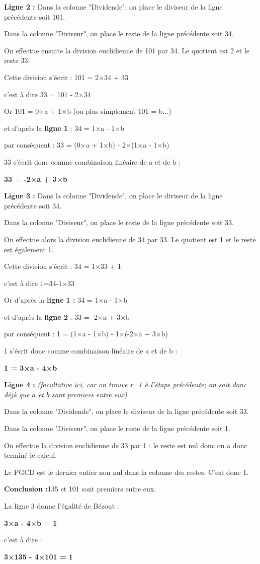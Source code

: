 \textbf{Ligne 2 :} Dans la colonne "Dividende", on place le diviseur de la ligne précédente soit 101.
\par
Dans la colonne "Diviseur", on place le reste de la ligne précédente soit 34.
\par
On effectue ensuite la division euclidienne de 101 par 34. Le quotient est 2 et le reste 33.
\par
Cette division s'écrit : 101 = 2×34 + 33
\par
c'est à dire 33 = 101 - 2×34
\par
Or 101 = 0×a + 1×b (ou plus simplement 101 = b...)
\par
et d'après la\textbf{ ligne 1} : 34 = 1×a - 1×b
\par
par conséquent : 33 = (0×a + 1×b) - 2×(1×a - 1×b)
\par
33 s'écrit donc  comme combinaison linéaire de a et de b :
\begin{center}\textbf{33 = -2×a + 3×b}\end{center}
\par
\textbf{Ligne 3 :} Dans la colonne "Dividende", on place le diviseur de la ligne précédente soit 34.
\par
Dans la colonne "Diviseur", on place le reste de la ligne précédente soit 33.
\par
On effectue alors la division euclidienne de 34 par 33. Le quotient est 1 et le reste est également 1.
\par
Cette division s'écrit : 34 = 1×33 + 1
\par
c'est à dire 1=34-1×33
\par
Or d'après la \textbf{ligne 1 :} 34 = 1×a - 1×b
\par
et d'après la \textbf{ligne 2} : 33 = -2×a + 3×b
\par
par conséquent : 1 = (1×a - 1×b) - 1×(-2×a + 3×b)
\par
1 s'écrit donc  comme combinaison linéaire de a et de b :
\begin{center}\textbf{1 = 3×a - 4×b}\end{center}
\par
\textbf{Ligne 4 : }\textit{(facultative ici, car on trouve r=1 à l'étape précédente; on sait donc déjà que $a$ et $b$ sont premiers entre eux)}
\par
Dans la colonne "Dividende", on place le diviseur de la ligne précédente soit 33.
\par
Dans la colonne "Diviseur", on place le reste de la ligne précédente soit 1.
\par
On effectue la division euclidienne de 33 par 1 : le reste est nul donc on a donc terminé le calcul.
\par
Le PGCD est le dernier entier non nul dans la colonne des restes. C'est donc 1.
\par
\textbf{Conclusion :}135 et 101 sont premiers entre eux.
\par
La ligne 3 donne l'égalité de Bézout :
\begin{center}\textbf{3×a - 4×b = 1}\end{center}
c'est à dire :
\begin{center}\textbf{3×135 - 4×101 = 1}\end{center}
